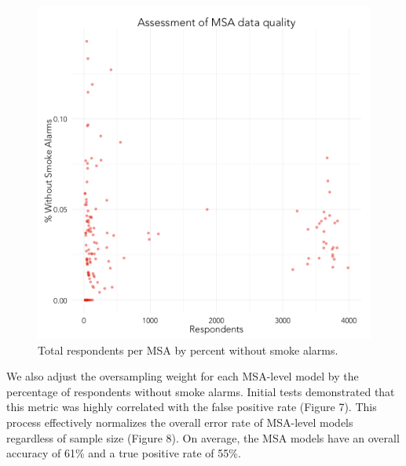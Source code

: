\documentclass{sig-alternate}
\begin{document}
\begin{figure}
\centering 
\includegraphics[scale=0.42]{compute-msa-stats-scatter-1.png}
\caption{Total respondents per MSA by percent without smoke alarms.}
\end{figure}

We also adjust the oversampling weight for each MSA-level model by the percentage of respondents without smoke alarms. Initial tests demonstrated that this metric was highly correlated with the false positive rate (Figure 7). This process effectively normalizes the overall error rate of MSA-level models regardless of sample size (Figure 8).  On average, the MSA models have an overall accuracy of 61\% and a true positive rate of 55\%. 
\end{document}
